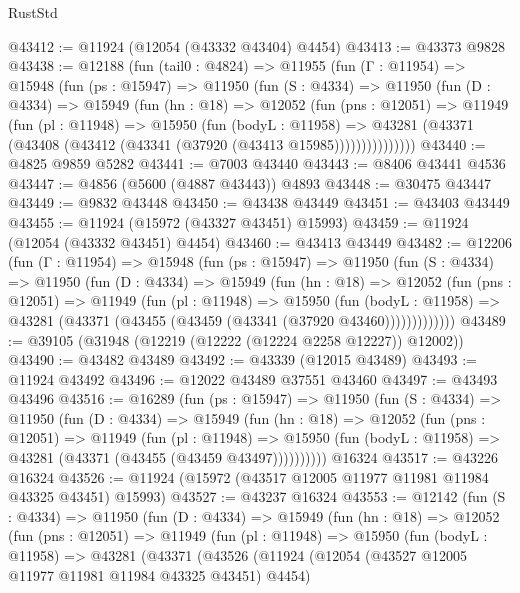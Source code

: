 \begin{lexlean}{RustStd}
\begin{coremodule}
{\begin{coremodule}
{{{{{{{{{{{{{{{{{{{{{{{{{{{{{{{{{{{{{{{{{{{{{{{{{{{{{{{{{{{{{{{{{{{{{{{{{{{{{{{{@43412 := @11924 (@12054 (@43332 @43404) @4454)
@43413 := @43373 @9828
@43438 := @12188
    (fun (tail0 : @4824) =>
    @11955
      (fun (Γ : @11954) =>
      @15948
        (fun (ps : @15947) =>
        @11950
          (fun (S : @4334) =>
          @11950
            (fun (D : @4334) =>
            @15949
              (fun (hn : @18) =>
              @12052
                (fun (pns : @12051) =>
                @11949
                  (fun (pl : @11948) =>
                  @15950
                    (fun (bodyL : @11958) =>
                    @43281 (@43371 (@43408 (@43412 (@43341 (@37920 (@43413 @15985)))))))))))))))
@43440 := @4825 @9859 @5282
@43441 := @7003 @43440
@43443 := @8406 @43441 @4536
@43447 := @4856 (@5600 (@4887 @43443)) @4893
@43448 := @30475 @43447
@43449 := @9832 @43448
@43450 := @43438 @43449
@43451 := @43403 @43449
@43455 := @11924 (@15972 (@43327 @43451) @15993)
@43459 := @11924 (@12054 (@43332 @43451) @4454)
@43460 := @43413 @43449
@43482 := @12206
    (fun (Γ : @11954) =>
    @15948
      (fun (ps : @15947) =>
      @11950
        (fun (S : @4334) =>
        @11950
          (fun (D : @4334) =>
          @15949
            (fun (hn : @18) =>
            @12052
              (fun (pns : @12051) =>
              @11949
                (fun (pl : @11948) =>
                @15950
                  (fun (bodyL : @11958) =>
                  @43281 (@43371 (@43455 (@43459 (@43341 (@37920 @43460)))))))))))))
@43489 := @39105 (@31948 (@12219 (@12222 (@12224 @2258 @12227)) @12002))
@43490 := @43482 @43489
@43492 := @43339 (@12015 @43489)
@43493 := @11924 @43492
@43496 := @12022 @43489 @37551 @43460
@43497 := @43493 @43496
@43516 := @16289
    (fun (ps : @15947) =>
    @11950
      (fun (S : @4334) =>
      @11950
        (fun (D : @4334) =>
        @15949
          (fun (hn : @18) =>
          @12052
            (fun (pns : @12051) =>
            @11949
              (fun (pl : @11948) =>
              @15950 (fun (bodyL : @11958) => @43281 (@43371 (@43455 (@43459 @43497))))))))))
    @16324
@43517 := @43226 @16324
@43526 := @11924 (@15972 (@43517 @12005 @11977 @11981 @11984 @43325 @43451) @15993)
@43527 := @43237 @16324
@43553 := @12142
    (fun (S : @4334) =>
    @11950
      (fun (D : @4334) =>
      @15949
        (fun (hn : @18) =>
        @12052
          (fun (pns : @12051) =>
          @11949
            (fun (pl : @11948) =>
            @15950
              (fun (bodyL : @11958) =>
              @43281
                (@43371
                  (@43526
                    (@11924
                      (@12054 (@43527 @12005 @11977 @11981 @11984 @43325 @43451) @4454)
}}}}}}}}}}}}}}}}}}}}}}}}}}}}}}}}}}}}}}}}}}}}}}}}}}}}}}}}}}}}}}}}}}}}}}}}}}}}}}}}
\end{coremodule}}
\end{coremodule}
\end{lexlean}
